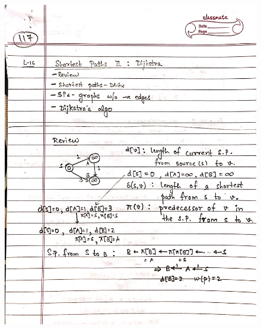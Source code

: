 \begin{figure}[H]
    \centering
    \includegraphics[scale=0.25]{"./MIT 6.006/MIT_6006_117"}
\end{figure}
\newpage

